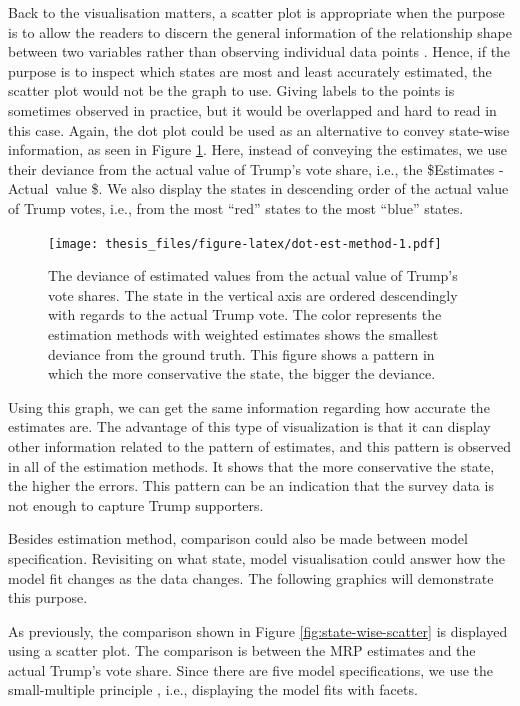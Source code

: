 \documentclass{monashthesis}
\begin{document}
Back to the visualisation matters, a scatter plot is appropriate when the purpose is to allow the readers to discern the general information of the relationship shape between two variables rather than observing individual data points \autocite{saundra}. Hence, if the purpose is to inspect which states are most and least accurately estimated, the scatter plot would not be the graph to use. Giving labels to the points is sometimes observed in practice, but it would be overlapped and hard to read in this case. Again, the dot plot could be used as an alternative to convey state-wise information, as seen in Figure \ref{fig:dot-est-method}. Here, instead of conveying the estimates, we use their deviance from the actual value of Trump's vote share, i.e., the \$Estimates - Actual~value \$. We also display the states in descending order of the actual value of Trump votes, i.e., from the most ``red'' states to the most ``blue'' states.

\begin{figure}
\centering
\texttt{[image: thesis\_files/figure-latex/dot-est-method-1.pdf]}
\caption{\label{fig:dot-est-method}The deviance of estimated values from the actual value of Trump's vote shares. The state in the vertical axis are ordered descendingly with regards to the actual Trump vote. The color represents the estimation methods with weighted estimates shows the smallest deviance from the ground truth. This figure shows a pattern in which the more conservative the state, the bigger the deviance.}
\end{figure}

Using this graph, we can get the same information regarding how accurate the estimates are. The advantage of this type of visualization is that it can display other information related to the pattern of estimates, and this pattern is observed in all of the estimation methods. It shows that the more conservative the state, the higher the errors. This pattern can be an indication that the survey data is not enough to capture Trump supporters.

Besides estimation method, comparison could also be made between model specification. Revisiting on what \textcite{WickhamHadley2015VsmR} state, model visualisation could answer how the model fit changes as the data changes. The following graphics will demonstrate this purpose.

As previously, the comparison shown in Figure \ref{fig:state-wise-scatter} is displayed using a scatter plot. The comparison is between the MRP estimates and the actual Trump's vote share. Since there are five model specifications, we use the small-multiple principle \autocite{MIDWAY2020100141}, i.e., displaying the model fits with facets.
\end{document}
